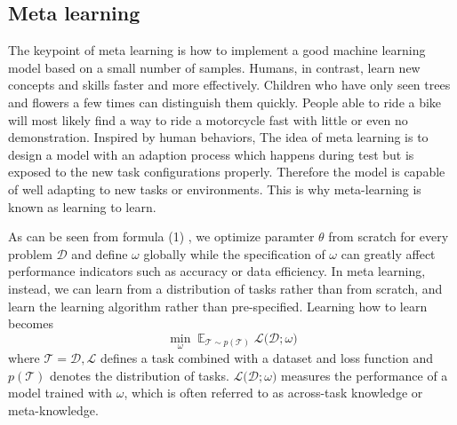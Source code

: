 \subsection{Meta learning}
The keypoint of meta learning is how to implement a good machine learning model based on a small number of samples. Humans, in contrast, learn new concepts and skills faster and more effectively. Children who have only seen trees and flowers a few times can distinguish them quickly. People able to ride a bike will most likely find a way to ride a motorcycle fast with little or even no demonstration.
Inspired by human behaviors, The idea of meta learning is to design a model with an adaption process which happens during test but is exposed to the new task configurations properly. Therefore the model is capable of well adapting to new tasks or environments. This is why meta-learning is known as learning to learn.

As can be seen from formula (1)%
, we optimize paramter $\theta$ from scratch for every problem $\mathcal{D}$ and define $\omega$ globally while the specification of $\omega$ can greatly affect performance indicators such as accuracy or data efficiency. In meta learning, instead, we can learn from a distribution of tasks rather than from scratch, and learn the learning algorithm rather than pre-specified. Learning how to learn becomes
\begin{equation}
  \min_\omega \mathop{\mathbb{E}}_{\mathcal{T}\sim p(\mathcal{T})} \mathcal{L(D};\omega)\tag{2}
\end{equation}
where $\mathcal{T}={\mathcal{D,L}}$ defines a task combined with a dataset and loss function and $p(\mathcal{T})$ denotes the distribution of tasks. $\mathcal{L(D};\omega)$ measures the performance of a model trained with $\omega$, which is often referred to as across-task knowledge or meta-knowledge.




